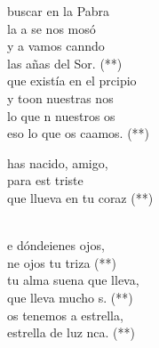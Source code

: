 \documentclass[12pt]{article}
\begin{document}
\begin{multicols*}{2}
\begin{cancion}%
	 buscar en la Pabra\\
	la a se nos mosó\\
	y a  vamos canndo \\
	las añas del Sor. (**) \\
	 que existía en el prcipio \\
	y toon nuestras nos\\
	lo que n nuestros os \\
	eso lo que os caamos. (**)\\
\end{cancion}%

\begin{cancion}%
	\begin{chorus}%
	has nacido, amigo,\\
	para est triste\\
	que llueva en tu coraz (**)\\
	\end{chorus}%
	\jump\\
	e dóndeienes ojos,\\
	ne ojos tu triza (**)\\
	tu alma suena  que lleva,\\
	que lleva mucho s. (**)\\
	os tenemos a estrella,\\
	 estrella de luz nca. (**)\\
\end{cancion}%


\end{multicols*}
\end{document}

